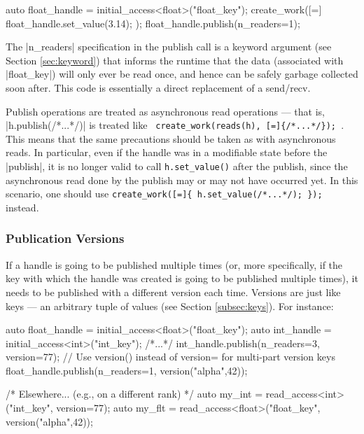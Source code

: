 \begin{CppCode}
auto float_handle = initial_access<float>("float_key");
create_work([=]{
  float_handle.set_value(3.14);
});
float_handle.publish(n_readers=1);
\end{CppCode}
The |n_readers| specification in the publish call is a keyword
argument (see Section \ref{sec:keyword}) that informs the runtime that the data
(associated with |float_key|) will only ever be read once, and hence
can be safely garbage collected soon after.  This code is essentially a direct
replacement of a send/recv.

Publish operations are treated as asynchronous read operations --- that is,
|h.publish(/*...*/)| is treated like
\verb| create_work(reads(h), [=]{/*...*/}); |. 
This means that the same precautions should be taken as with asynchronous reads. 
In particular, even if the handle was in a modifiable state before the 
|publish|, it is no
longer valid to call \lstinline!h.set_value()! after the publish, since the
asynchronous read done by the publish may or may not have occurred yet.  In this
scenario, one should use \verb|create_work([=]{ h.set_value(/*...*/); });|
instead.



\subsubsection{Publication Versions}

If a handle is going to be published multiple times (or, more specifically, if
the key with which the handle was created is going to be published multiple
times), it needs to be published with a different version each time.  Versions
are just like keys --- an arbitrary tuple of values (see Section
\ref{subsec:keys}).  For instance:

\begin{CppCode}
auto float_handle = initial_access<float>("float_key");
auto int_handle = initial_access<int>("int_key");
/*...*/
int_handle.publish(n_readers=3, version=77);
// Use version() instead of version= for multi-part version keys
float_handle.publish(n_readers=1, version("alpha",42));

/* Elsewhere... (e.g., on a different rank) */
auto my_int = read_access<int>("int_key", version=77);
auto my_flt = read_access<float>("float_key", version("alpha",42));

\end{CppCode}


